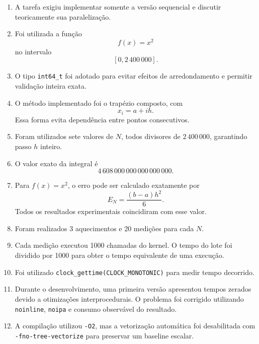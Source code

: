 \begin{enumerate}
    \item A tarefa exigiu implementar somente a versão sequencial e discutir
    teoricamente sua paralelização.

    \item Foi utilizada a função
    \[
        f(x)=x^2
    \]
    no intervalo
    \[
        [0,2\,400\,000].
    \]

    \item O tipo \texttt{int64\_t} foi adotado para evitar efeitos de
    arredondamento e permitir validação inteira exata.

    \item O método implementado foi o trapézio composto, com
    \[
        x_i=a+ih.
    \]
    Essa forma evita dependência entre pontos consecutivos.

    \item Foram utilizados sete valores de \(N\), todos divisores de
    \(2\,400\,000\), garantindo passo \(h\) inteiro.

    \item O valor exato da integral é
    \[
        4\,608\,000\,000\,000\,000\,000.
    \]

    \item Para \(f(x)=x^2\), o erro pode ser calculado exatamente por
    \[
        E_N=\frac{(b-a)h^2}{6}.
    \]
    Todos os resultados experimentais coincidiram com esse valor.

    \item Foram realizados 3 aquecimentos e 20 medições para cada \(N\).

    \item Cada medição executou 1000 chamadas do kernel. O tempo do lote foi
    dividido por 1000 para obter o tempo equivalente de uma execução.

    \item Foi utilizado
    \texttt{clock\_gettime(CLOCK\_MONOTONIC)} para medir tempo decorrido.

    \item Durante o desenvolvimento, uma primeira versão apresentou tempos
    zerados devido a otimizações interprocedurais. O problema foi corrigido
    utilizando \texttt{noinline}, \texttt{noipa} e consumo observável do
    resultado.

    \item A compilação utilizou \texttt{-O2}, mas a vetorização automática
    foi desabilitada com \texttt{-fno-tree-vectorize} para preservar um
    baseline escalar.


\end{enumerate}
